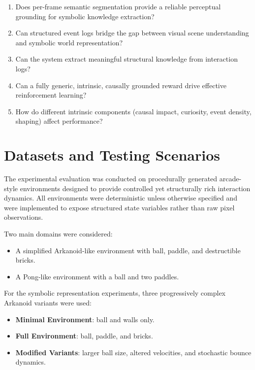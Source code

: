 \documentclass[12pt,a4paper]{report}
\begin{document}
\begin{enumerate}
    \item Does per-frame semantic segmentation provide a reliable perceptual grounding for symbolic knowledge extraction?
    
    \item Can structured event logs bridge the gap between visual scene understanding and symbolic world representation?
    
    \item Can the system extract meaningful structural knowledge from interaction logs?
    
    \item Can a fully generic, intrinsic, causally grounded reward drive effective reinforcement learning?
    
    \item How do different intrinsic components (causal impact, curiosity, event density, shaping) affect performance?
\end{enumerate}


\section{Datasets and Testing Scenarios}

The experimental evaluation was conducted on procedurally generated arcade-style environments designed to provide controlled yet structurally rich interaction dynamics. All environments were deterministic unless otherwise specified and were implemented to expose structured state variables rather than raw pixel observations.

Two main domains were considered:
\begin{itemize}
    \item A simplified Arkanoid-like environment with ball, paddle, and destructible bricks.
    \item A Pong-like environment with a ball and two paddles.
\end{itemize}

\noindent For the symbolic representation experiments, three progressively complex Arkanoid variants were used:
\begin{itemize}
    \item \textbf{Minimal Environment}: ball and walls only.
    \item \textbf{Full Environment}: ball, paddle, and bricks.
    \item \textbf{Modified Variants}: larger ball size, altered velocities, and stochastic bounce dynamics.
\end{itemize}
\end{document}
